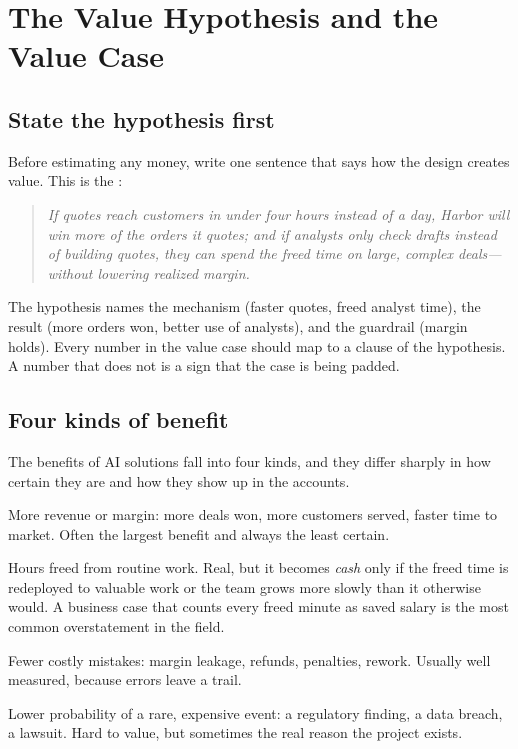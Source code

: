 
\section{The Value Hypothesis and the Value Case}
\label{sec:value-case}

\subsection{State the hypothesis first}

Before estimating any money, write one sentence that says how the design creates value. This is the :

\begin{quote}
\emph{If quotes reach customers in under four hours instead of a day, Harbor will win more of the orders it quotes; and if analysts only check drafts instead of building quotes, they can spend the freed time on large, complex deals---without lowering realized margin.}
\end{quote}

The hypothesis names the mechanism (faster quotes, freed analyst time), the result (more orders won, better use of analysts), and the guardrail (margin holds). Every number in the value case should map to a clause of the hypothesis. A number that does not is a sign that the case is being padded.

\subsection{Four kinds of benefit}

The benefits of AI solutions fall into four kinds, and they differ sharply in how certain they are and how they show up in the accounts.
\begin{description}[leftmargin=1em,itemsep=2pt]
  \item[Growth.] More revenue or margin: more deals won, more customers served, faster time to market. Often the largest benefit and always the least certain.
  \item[Labor capacity.] Hours freed from routine work. Real, but it becomes \emph{cash} only if the freed time is redeployed to valuable work or the team grows more slowly than it otherwise would. A business case that counts every freed minute as saved salary is the most common overstatement in the field.
  \item[Error reduction.] Fewer costly mistakes: margin leakage, refunds, penalties, rework. Usually well measured, because errors leave a trail.
  \item[Risk reduction.] Lower probability of a rare, expensive event: a regulatory finding, a data breach, a lawsuit. Hard to value, but sometimes the real reason the project exists.
\end{description}

